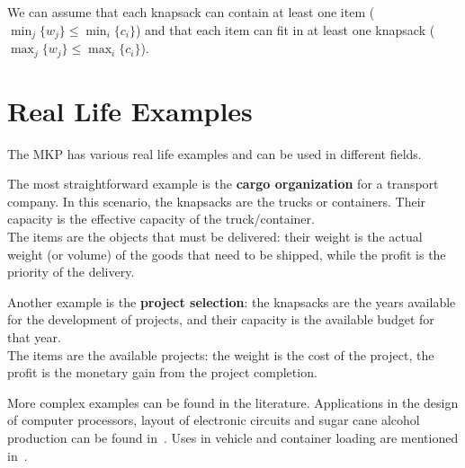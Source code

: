 We can assume that each knapsack can contain at least one item
(\(\min_{j}\{w_{j}\} \leq \min_{i}\{c_{i}\}\))
and that each item can fit in at least one knapsack
(\(\max_{j}\{w_{j}\} \leq \max_{i}\{c_{i}\}\)).


\section{Real Life Examples}
The MKP has various real life examples and can be used in different fields.

The most straightforward example is the \textbf{cargo organization} for a transport company.
In this scenario, the knapsacks are the trucks or containers.
Their capacity is the effective capacity of the truck/container.\\
The items are the objects that must be delivered:
their weight is the actual weight (or volume) of the goods that need to be shipped,
while the profit is the priority of the delivery.

Another example is the \textbf{project selection}: the knapsacks are
the years available for the development of projects,
and their capacity is the available budget for that year.\\
The items are the available projects: the weight is the cost of the project,
the profit is the monetary gain from the project completion.

More complex examples can be found in the literature.
Applications in the design of computer processors, layout of electronic
circuits and sugar cane alcohol production can be found in~\cite{example:1996}.
Uses in vehicle and container loading are mentioned in~\cite{example:1971}.